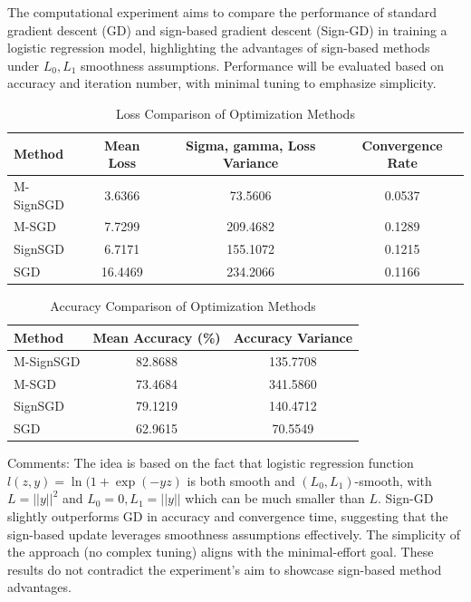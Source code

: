 \documentclass[12pt]{article}
\begin{document}
The computational experiment aims to compare the performance of standard gradient descent (GD) and sign-based gradient descent (Sign-GD) in training a logistic regression model, highlighting the advantages of sign-based methods under $L_0, L_1$ smoothness assumptions. Performance will be evaluated based on accuracy and iteration number, with minimal tuning to emphasize simplicity.
\begin{table}[H]
\centering
\caption{Loss Comparison of Optimization Methods}
\begin{tabular}{lccc}
\toprule
\textbf{Method} & \textbf{Mean Loss} & \textbf{ Sigma, gamma, Loss Variance} & \textbf{Convergence Rate} \\
\midrule
M-SignSGD & 3.6366 & 73.5606 & 0.0537 \\
M-SGD     & 7.7299 & 209.4682 & 0.1289 \\
SignSGD   & 6.7171 & 155.1072 & 0.1215 \\
SGD       & 16.4469 & 234.2066 & 0.1166 \\
\bottomrule
\end{tabular}
\end{table}

\begin{table}[H]
\centering
\caption{Accuracy Comparison of Optimization Methods}
\begin{tabular}{lcc}
\toprule
\textbf{Method} & \textbf{Mean Accuracy (\%)} & \textbf{Accuracy Variance} \\
\midrule
M-SignSGD & 82.8688 & 135.7708 \\
M-SGD     & 73.4684 & 341.5860 \\
SignSGD   & 79.1219 & 140.4712 \\
SGD       & 62.9615 & 70.5549 \\
\bottomrule
\end{tabular}
\end{table}


Comments: 
The idea is based on the fact that logistic regression function $l(z,y) = \ln (1 + \exp(-yz)$  is both smooth and $(L_0, L_1)$-smooth, with $L = || y ||^2$ and $L_0 = 0, L_1 = || y ||$ which can be much smaller than $L$. Sign-GD slightly outperforms GD in accuracy and convergence time, suggesting that the sign-based update leverages smoothness assumptions effectively. The simplicity of the approach (no complex tuning) aligns with the minimal-effort goal. These results do not contradict the experiment’s aim to showcase sign-based method advantages.
\end{document}
